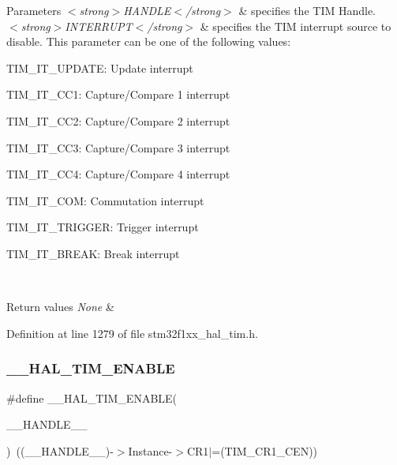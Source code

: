 \begin{DoxyParams}{Parameters}
{\em $<$strong$>$\+H\+A\+N\+D\+L\+E$<$/strong$>$} & specifies the T\+IM Handle. \\
\hline
{\em $<$strong$>$\+I\+N\+T\+E\+R\+R\+U\+P\+T$<$/strong$>$} & specifies the T\+IM interrupt source to disable. This parameter can be one of the following values\+: \begin{DoxyItemize}
\item T\+I\+M\+\_\+\+I\+T\+\_\+\+U\+P\+D\+A\+TE\+: Update interrupt \item T\+I\+M\+\_\+\+I\+T\+\_\+\+C\+C1\+: Capture/\+Compare 1 interrupt \item T\+I\+M\+\_\+\+I\+T\+\_\+\+C\+C2\+: Capture/\+Compare 2 interrupt \item T\+I\+M\+\_\+\+I\+T\+\_\+\+C\+C3\+: Capture/\+Compare 3 interrupt \item T\+I\+M\+\_\+\+I\+T\+\_\+\+C\+C4\+: Capture/\+Compare 4 interrupt \item T\+I\+M\+\_\+\+I\+T\+\_\+\+C\+OM\+: Commutation interrupt \item T\+I\+M\+\_\+\+I\+T\+\_\+\+T\+R\+I\+G\+G\+ER\+: Trigger interrupt \item T\+I\+M\+\_\+\+I\+T\+\_\+\+B\+R\+E\+AK\+: Break interrupt \end{DoxyItemize}
\\
\hline
\end{DoxyParams}

\begin{DoxyRetVals}{Return values}
{\em None} & \\
\hline
\end{DoxyRetVals}


Definition at line 1279 of file stm32f1xx\+\_\+hal\+\_\+tim.\+h.

\mbox{\label{group___t_i_m___exported___macros_ga1a90544705059e9f19f991651623b0c0}} 
\subsubsection{\texorpdfstring{\+\_\+\+\_\+\+H\+A\+L\+\_\+\+T\+I\+M\+\_\+\+E\+N\+A\+B\+LE}{\_\_HAL\_TIM\_ENABLE}}
{\footnotesize\ttfamily \#define \+\_\+\+\_\+\+H\+A\+L\+\_\+\+T\+I\+M\+\_\+\+E\+N\+A\+B\+LE(\begin{DoxyParamCaption}\item[{}]{\+\_\+\+\_\+\+H\+A\+N\+D\+L\+E\+\_\+\+\_\+ }\end{DoxyParamCaption})~((\+\_\+\+\_\+\+H\+A\+N\+D\+L\+E\+\_\+\+\_\+)-\/$>$Instance-\/$>$C\+R1$\vert$=(T\+I\+M\+\_\+\+C\+R1\+\_\+\+C\+EN))}



